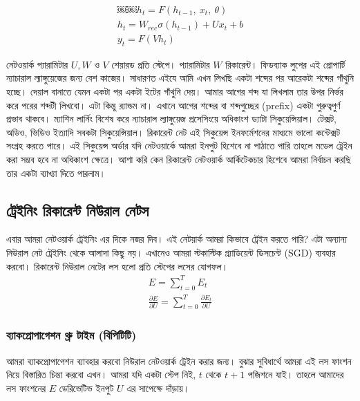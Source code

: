 \documentclass{book}
\begin{document}
\begin{align} %
  ￼￼h_t = F(h_{t−1}, \ x_t, \ θ)\\
  h_t = W_{rec} \sigma (h_{t−1}) + U x_t + b \\ 
  y_t = F(V h_t)
\end{align}

নেটওয়ার্ক প্যারামিটার $U, W$ ও $V$ শেয়ারড প্রতি স্টেপে। প্যারামিটার $W$ রিকারেন্ট। ফিডব্যাক লুপের এই প্রোপার্টি ন্যাচারাল ল্যাঙ্গুয়েজের জন্য বেশ কাজের। 
সাধারণত এইযে আমি এখন লিখছি একটা শব্দের পর আরেকটা শব্দের গাঁথুনি হচ্ছে। দেয়াল বানাতে যেমন একটা পর একটা ইটের গাঁথুনি দেয়। 
আমার আগের শব্দ যা লিখলাম তার উপর নির্ভর করে পরের শব্দটী লিখবো। এটা কিন্তু র‍্যান্ডম না। এখানে আগের শব্দের বা শব্দগুচ্ছের (prefix)  একটা গুরুত্বপুর্ণ প্রভাব থাকবে। 
ম্যাশিন লার্নিং বিশেষ করে ন্যাচারাল ল্যাঙ্গুয়েজ প্রসেসিংয়ে  অধিকাংশ ড্যাটা সিকুয়েন্সিয়াল। টেক্সট, অডিও, ভিডিও ইত্যাদি সবকটা সিকুয়েন্সিয়াল।
রিকারেন্ট নেট এই সিকুয়েন্স ইনফর্মেশনের মাধ্যমে ভালো কন্টেক্সট সংগ্রহ করতে পারে। এই সিকুয়েন্স অর্ডার যদি নেটওয়ার্কে আমরা ইনপুট হিশেবে না পাঠাতে পারি তাহলে 
মডেল ট্রেইন করা সম্ভব হবে না অধিকাংশ ক্ষেত্রে। আশা করি কেন রিকারেন্ট নেটওয়ার্ক আর্কিটেকচার হিশেবে আমরা নির্বাচন করছি তার একটা ব্যাখ্যা দিতে পারলাম। 

\subsection{ট্রেইনিং রিকারেন্ট নিউরাল নেটস}
এবার আমরা নেটওয়ার্ক ট্রেইনিং এর দিকে নজর দিব। এই নেটয়ার্ক আমরা কিভাবে ট্রেইন করতে পারি? এটা অন্যান্য নিউরাল নেট ট্রেইনিং থেকে আলাদা কিছু নয়।
এখানেও আমরা স্টকাস্টিক গ্র্যাডিয়েন্ট ডিসচেন্ট  (SGD) ব্যবহার করবো। রিকারেন্ট নিউরাল নেটের লস হলো প্রতি স্টেপের লসের যোগফল। 
\begin{align} %
   E = \sum_{t=0} ^{T} E_t \\
   \frac {\partial E} {\partial U} = \sum _{t=0} ^{T} \frac {\partial E_t} { \partial U}
\end{align}



\subsubsection{ব্যাকপ্রোপাগেশন থ্রু টাইম (বিপিটিটি)}
আমরা ব্যাকপ্রোপাগেশন ব্যাবহার করবো নিউরাল নেটওয়ার্ক ট্রেইন করার জন্য। বুঝার সুবিধার্থে আমরা এই লস ফাংশন নিয়ে বিস্তারিত চিন্তা করবো এখন। আমরা যদি একটা স্টেপ নিই, $t$ থেকে $t+1$ পজিশনে যাই। তাহলে আমাদের লস ফাংশনের $E$ ডেরিভেটিভ ইনপুট $U$ এর সাপেক্ষে দাঁড়ায়। 
\end{document}
